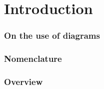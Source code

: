 \chapter{Introduction}\label{chap:introduction}








\subsection*{On the use of diagrams}


\cite{ibm2003uml}


\cite{ibm2004sequence, ibm2006wsr}


\subsection*{Nomenclature}

\subsection*{Overview}
